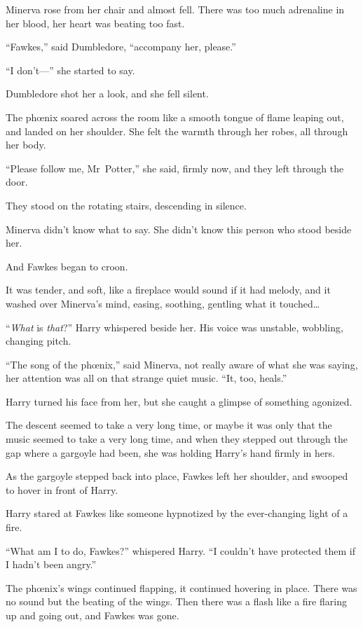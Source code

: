 Minerva rose from her chair and almost fell. There was too much adrenaline in her blood, her heart was beating too fast.

“Fawkes,” said Dumbledore, “accompany her, please.”

“I don’t—” she started to say.

Dumbledore shot her a look, and she fell silent.

The phœnix soared across the room like a smooth tongue of flame leaping out, and landed on her shoulder. She felt the warmth through her robes, all through her body.

“Please follow me, Mr~Potter,” she said, firmly now, and they left through the door.

\later

They stood on the rotating stairs, descending in silence.

Minerva didn’t know what to say. She didn’t know this person who stood beside her.

And Fawkes began to croon.

It was tender, and soft, like a fireplace would sound if it had melody, and it washed over Minerva’s mind, easing, soothing, gentling what it touched…

“\emph{What} is \emph{that}?” Harry whispered beside her. His voice was unstable, wobbling, changing pitch.

“The song of the phœnix,” said Minerva, not really aware of what she was saying, her attention was all on that strange quiet music. “It, too, heals.”

Harry turned his face from her, but she caught a glimpse of something agonized.

The descent seemed to take a very long time, or maybe it was only that the music seemed to take a very long time, and when they stepped out through the gap where a gargoyle had been, she was holding Harry’s hand firmly in hers.

As the gargoyle stepped back into place, Fawkes left her shoulder, and swooped to hover in front of Harry.

Harry stared at Fawkes like someone hypnotized by the ever-changing light of a fire.

“What am I to do, Fawkes?” whispered Harry. “I couldn’t have protected them if I hadn’t been angry.”

The phœnix’s wings continued flapping, it continued hovering in place. There was no sound but the beating of the wings. Then there was a flash like a fire flaring up and going out, and Fawkes was gone.

